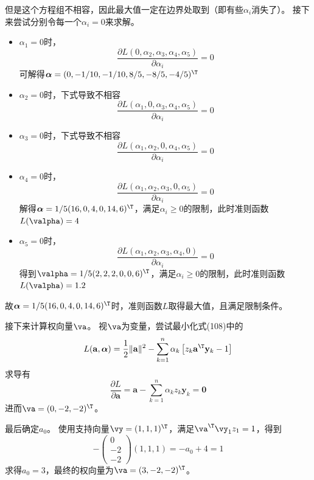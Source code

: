 \documentclass[reportComp]{thesis}
\begin{document}
\begin{answer}
\begin{itemize}
	但是这个方程组不相容，因此最大值一定在边界处取到（即有些$\alpha_i$消失了）。
	接下来尝试分别令每一个$\alpha_i=0$来求解。
	\begin{itemize}
	\item $\alpha_1=0$时，
	\[\frac{\partial L\left(0, \alpha_{2}, \alpha_{3}, \alpha_{4}, \alpha_{5}\right)}{\partial \alpha_{i}}=0\]
	可解得$\boldsymbol{\alpha}=(0,-1/10,-1/10,8/5,-8/5,-4/5)^\T $
	\item $\alpha_2=0$时，下式导致不相容
	\[\frac{\partial L\left(\alpha_{1}, 0, \alpha_{3}, \alpha_{4}, \alpha_{5}\right)}{\partial \alpha_{i}}=0\]
	\item $\alpha_3=0$时，下式导致不相容
	\[\frac{\partial L\left(\alpha_{1}, \alpha_{2}, 0, \alpha_{4}, \alpha_{5}\right)}{\partial \alpha_{i}}=0\]
	\item $\alpha_4=0$时，
	\[\frac{\partial L\left(\alpha_{1}, \alpha_{2}, \alpha_{3}, 0, \alpha_{5}\right)}{\partial \alpha_{i}}=0\]
	解得$\boldsymbol{\alpha}=1/5(16,0,4,0,14,6)^\T $，满足$\alpha_i\geq 0$的限制，此时准则函数$L(\valpha)=4$
	\item $\alpha_5=0$时，
	\[\frac{\partial L\left(\alpha_{1}, \alpha_{2}, \alpha_{3}, \alpha_{4}, 0\right)}{\partial \alpha_{i}}=0\]
	得到$\valpha=1 / 5(2,2,2,0,0,6)^\T $，满足$\alpha_i\geq 0$的限制，此时准则函数$L(\valpha)=1.2$
	\end{itemize}
	故$\boldsymbol{\alpha}=1/5(16,0,4,0,14,6)^\T $时，准则函数$L$取得最大值，且满足限制条件。

	接下来计算权向量$\va$。
	视$\va$为变量，尝试最小化式(108)中的
	\[L(\mathbf{a}, \boldsymbol{\alpha})=\frac{1}{2}\|\mathbf{a}\|^{2}-\sum_{k=1}^{n} \alpha_{k}\left[z_{k} \mathbf{a}^\T  \mathbf{y}_{k}-1\right]\]
	求导有
	\[\frac{\partial L}{\partial \mathbf{a}}=\mathbf{a}-\sum_{k=1}^{n} \alpha_{k} z_{k} \mathbf{y}_{k}=\mathbf{0}\]
	进而$\va=(0,-2,-2)^\T $。

	最后确定$a_0$。
	使用支持向量$\vy=(1,1,1)^\T $，满足$\va^\T \vy_1z_1=1$，得到
	\[-\left(\begin{array}{c}{0} \\ {-2} \\ {-2}\end{array}\right)(1,1,1)=-a_{0}+4=1\]
	求得$a_0=3$，最终的权向量为$\va=(3,-2,-2)^\T $。
\end{itemize}
\end{answer}
\end{document}
